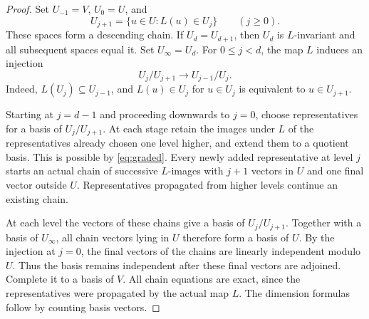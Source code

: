 \documentclass[11pt]{article}
\theoremstyle{remark}\newtheorem{remark}[theorem]{Remark}
\begin{document}
\begin{proof}
Set $U_{-1}=V$, $U_0=U$, and
\[
 U_{j+1}=\{u\in U:L(u)\in U_j\}\qquad(j\ge0).
\]
These spaces form a descending chain. If $U_d=U_{d+1}$, then $U_d$ is $L$-invariant and all subsequent spaces equal it. Set $U_\infty=U_d$. For $0\le j<d$, the map $L$ induces an injection
\begin{equation}\label{eq:graded}
 U_j/U_{j+1}\longrightarrow U_{j-1}/U_j.
\end{equation}
Indeed, $L(U_j)\subseteq U_{j-1}$, and $L(u)\in U_j$ for $u\in U_j$ is equivalent to $u\in U_{j+1}$.

Starting at $j=d-1$ and proceeding downwards to $j=0$, choose representatives for a basis of $U_j/U_{j+1}$. At each stage retain the images under $L$ of the representatives already chosen one level higher, and extend them to a quotient basis. This is possible by \eqref{eq:graded}. Every newly added representative at level $j$ starts an actual chain of successive $L$-images with $j+1$ vectors in $U$ and one final vector outside $U$. Representatives propagated from higher levels continue an existing chain.

At each level the vectors of these chains give a basis of $U_j/U_{j+1}$. Together with a basis of $U_\infty$, all chain vectors lying in $U$ therefore form a basis of $U$. By the injection at $j=0$, the final vectors of the chains are linearly independent modulo $U$. Thus the basis remains independent after these final vectors are adjoined. Complete it to a basis of $V$. All chain equations are exact, since the representatives were propagated by the actual map $L$. The dimension formulas follow by counting basis vectors.
\end{proof}
\end{document}
